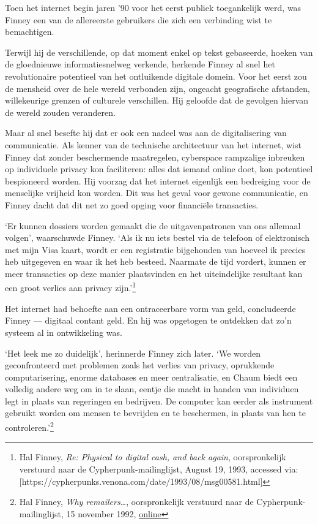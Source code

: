 \documentclass[
  a5paper,
  smalldemyvopaper,11pt,twoside,onecolumn,openright,extrafontsizes,
hidelinks]{memoir}
\begin{document}
Toen het internet begin jaren '90 voor het eerst publiek toegankelijk
werd, was Finney een van de allereerste gebruikers die zich een
verbinding wist te bemachtigen.

Terwijl hij de verschillende, op dat moment enkel op tekst gebaseerde,
hoeken van de gloednieuwe informatiesnelweg verkende, herkende Finney al
snel het revolutionaire potentieel van het ontluikende digitale domein.
Voor het eerst zou de mensheid over de hele wereld verbonden zijn,
ongeacht geografische afstanden, willekeurige grenzen of culturele
verschillen. Hij geloofde dat de gevolgen hiervan de wereld zouden
veranderen.

Maar al snel besefte hij dat er ook een nadeel was aan de digitalisering
van communicatie. Als kenner van de technische architectuur van het
internet, wist Finney dat zonder beschermende maatregelen, cyberspace
rampzalige inbreuken op individuele privacy kon faciliteren: alles dat
iemand online doet, kon potentieel bespioneerd worden. Hij voorzag dat
het internet eigenlijk een bedreiging voor de menselijke vrijheid kon
worden. Dit was het geval voor gewone communicatie, en Finney dacht dat
dit net zo goed opging voor financiële transacties.

`Er kunnen dossiers worden gemaakt die de uitgavenpatronen van ons
allemaal volgen', waarschuwde Finney. `Als ik nu iets bestel via de
telefoon of elektronisch met mijn Visa kaart, wordt er een registratie
bijgehouden van hoeveel ik precies heb uitgegeven en waar ik het heb
besteed. Naarmate de tijd vordert, kunnen er meer transacties op deze
manier plaatsvinden en het uiteindelijke resultaat kan een groot verlies
aan privacy zijn.'\footnote{Hal Finney, \emph{Re: Physical to digital
  cash, and back again}, oorspronkelijk verstuurd naar de
  Cypherpunk-mailinglijst, August 19, 1993, accessed via:
  {[}https://cypherpunks.venona.com/date/1993/08/msg00581.html{]}}

Het internet had behoefte aan een ontraceerbare vorm van geld,
concludeerde Finney --- digitaal contant geld. En hij was opgetogen te
ontdekken dat zo'n systeem al in ontwikkeling was.

`Het leek me zo duidelijk', herinnerde Finney zich later. `We worden
geconfronteerd met problemen zoals het verlies van privacy, oprukkende
computarisering, enorme databases en meer centralisatie, en Chaum biedt
een volledig andere weg om in te slaan, eentje die macht in handen van
individuen legt in plaats van regeringen en bedrijven. De computer kan
eerder als instrument gebruikt worden om mensen te bevrijden en te
beschermen, in plaats van hen te controleren.'\footnote{Hal Finney,
  \emph{Why remailers\ldots{}}, oorspronkelijk verstuurd naar de
  Cypherpunk-mailinglijst, 15 november 1992,
  \href{https://cypherpunks.venona.com/date/1993/08/msg00581.html}{online}}
\end{document}
